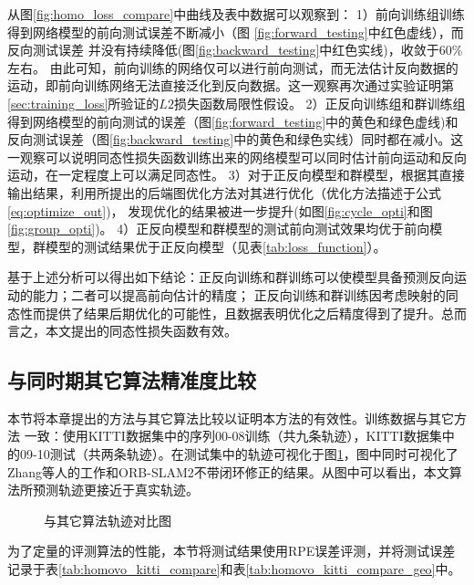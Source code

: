 从图\ref{fig:homo_loss_compare}中曲线及表中数据可以观察到：
1）前向训练组训练得到网络模型的前向测试误差不断减小（图 \ref{fig:forward_testing}中红色虚线），而反向测试误差
并没有持续降低(图\ref{fig:backward_testing}中红色实线)，收敛于60\%左右。
由此可知，前向训练的网络仅可以进行前向测试，而无法估计反向数据的运动，即前向训练网络无法直接泛化到反向数据。这一观察再次通过实验证明第\ref{sec:training_loss}所验证的$L2$损失函数局限性假设。
2）正反向训练组和群训练组得到网络模型的前向测试的误差（图\ref{fig:forward_testing}中的黄色和绿色虚线)和反向测试误差（图\ref{fig:backward_testing}中的黄色和绿色实线）同时都在减小。这一观察可以说明同态性损失函数训练出来的网络模型可以同时估计前向运动和反向运动，在一定程度上可以满足同态性。
3）对于正反向模型和群模型，根据其直接输出结果，利用所提出的后端图优化方法对其进行优化（优化方法描述于公式\eqref{eq:optimize_out})，
发现优化的结果被进一步提升(如图\ref{fig:cycle_opti}和图\ref{fig:group_opti})。
4）正反向模型和群模型的测试前向测试效果均优于前向模型，群模型的测试结果优于正反向模型（见表\ref{tab:loss_function}）。

基于上述分析可以得出如下结论：正反向训练和群训练可以使模型具备预测反向运动的能力；二者可以提高前向估计的精度；
正反向训练和群训练因考虑映射的同态性而提供了结果后期优化的可能性，且数据表明优化之后精度得到了提升。总而言之，本文提出的同态性损失函数有效。


%
%


\subsection{与同时期其它算法精准度比较}
\label{sec:exp_homo_compare}
%

本节将本章提出的方法与其它算法比较以证明本方法的有效性。训练数据与其它方法
\cite{zhou2017unsupervised,zhan2018unsupervised,yin2018geonet}
一致：使用KITTI数据集中的序列00-08训练（共九条轨迹），KITTI数据集中的09-10测试（共两条轨迹）。在测试集中的轨迹可视化于图\ref{fig:path_result}，图中同时可视化了Zhang等人的工作和ORB-SLAM2不带闭环修正的结果。从图中可以看出，本文算法所预测轨迹更接近于真实轨迹。
\begin{figure}[h]
    \centering
    \caption{与其它算法轨迹对比图}
    {\label{fig:path_result}}
    \end{figure}
为了定量的评测算法的性能，本节将测试结果使用RPE误差评测\cite{geiger2012kitti}，并将测试误差
记录于表\ref{tab:homovo_kitti_compare}和表\ref{tab:homovo_kitti_compare_geo}中。

